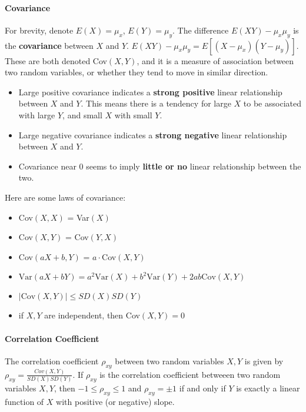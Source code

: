 \documentclass[10pt,letter]{article}
\begin{document}
\paragraph{Covariance} For brevity, denote $E(X)=\mu_x$, $E(Y)=\mu_y$. The difference $E(XY) - \mu_x\mu_y$ is the \textbf{covariance} between $X$ and $Y$. $E(XY)-\mu_x\mu_y=E[(X-\mu_x)(Y-\mu_y)]$. These are both denoted Cov$(X,Y)$, and it is a measure of association between two random variables, or whether they tend to move in similar direction. \begin{itemize}
    \item Large positive covariance indicates a \textbf{strong positive} linear relationship between $X$ and $Y$. This means there is a tendency for large $X$ to be associated with large $Y$, and small $X$ with small $Y$.
    \item Large negative covariance indicates a \textbf{strong negative} linear relationship between $X$ and $Y$.
    \item Covariance near 0 seems to imply \textbf{little or no} linear relationship between the two.
\end{itemize} Here are some laws of covariance: 
\begin{itemize}
    \item Cov$(X,X)$ = Var$(X)$
    \item Cov$(X,Y)$ = Cov$(Y,X)$
    \item Cov$(aX+b, Y)$ = $a\cdot$Cov$(X,Y)$
    \item $\text{Var}(aX+bY) = a^2\text{Var}(X) + b^2\text{Var}(Y) + 2ab\text{Cov}(X, Y)$
    \item $|\text{Cov}(X,Y)|\leq SD(X)SD(Y)$
    \item if $X,Y$ are independent, then Cov$(X,Y) =  0$
\end{itemize}

\paragraph{Correlation Coefficient} The correlation coefficient $\rho_{xy}$ between two random variables $X,Y$ is given by $\rho_{xy}=\frac{Cov(X,Y)}{SD(X)SD(Y)}$. If $\rho_{xy}$ is the correlation coefficient betweeen two random variables $X,Y$, then $-1\leq\rho_{xy}\leq1$ and $\rho_{xy}=\pm1$ if and only if $Y$ is exactly a linear function of $X$ with positive (or negative) slope.
\end{document}

